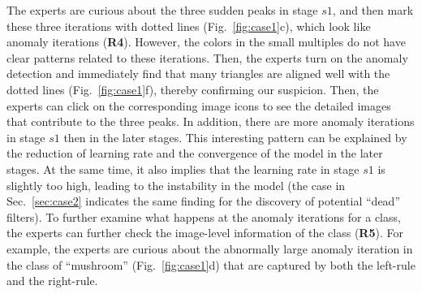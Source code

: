\documentclass[format=acmsmall, review=false, screen=true]{acmart}
\begin{document}
The experts are curious about the three sudden peaks in stage $s1$, and then mark these three iterations with dotted lines (Fig.~\ref{fig:case1}c), which look like anomaly iterations (\textbf{R4}).
However, the colors in the small multiples do not have clear patterns related to these iterations.
Then, the experts turn on the anomaly detection and immediately find that many triangles are aligned well with the dotted lines (Fig.~\ref{fig:case1}f), thereby confirming our suspicion.
Then, the experts can click on the corresponding image icons to see the detailed images that contribute to the three peaks.
In addition, there are more anomaly iterations in stage $s1$ then in the later stages.
This interesting pattern can be explained by the reduction of learning rate and the convergence of the model in the later stages. At the same time, it also implies that the learning rate in stage $s1$ is slightly too high, leading to the instability in the model (the case in Sec.~\ref{sec:case2} indicates the same finding for the discovery of potential ``dead'' filters).
To further examine what happens at the anomaly iterations for a class, the experts can further check the image-level information of the class (\textbf{R5}).
For example, the experts are curious about the abnormally large anomaly iteration in the class of ``mushroom'' (Fig.~\ref{fig:case1}d) that are captured by both the left-rule and the right-rule.
\end{document}
